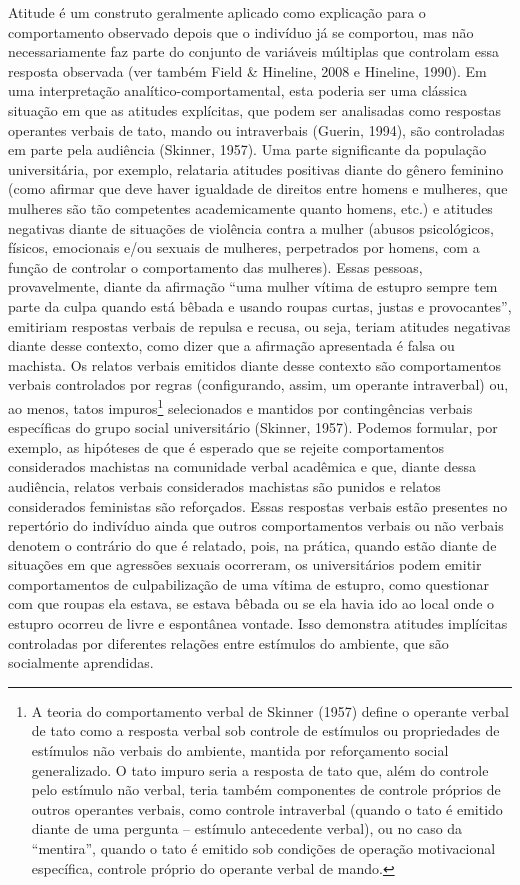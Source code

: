 Atitude é um construto geralmente aplicado como explicação para o comportamento observado depois que o indivíduo já se comportou, mas não necessariamente faz parte do conjunto de variáveis múltiplas que controlam essa resposta observada (ver também Field \& Hineline, 2008 e Hineline, 1990). Em uma interpretação analítico-comportamen\-tal, esta poderia ser uma clássica situação em que as atitudes explícitas, que podem ser analisadas como respostas operantes verbais de tato, mando ou intraverbais (Guerin, 1994), são controladas em parte pela audiência (Skinner, 1957). Uma parte significante da população universitária, por exemplo, relataria atitudes positivas diante do gênero feminino (como afirmar que deve haver igualdade de direitos entre homens e mulheres, que mulheres são tão competentes academicamente quanto homens, etc.) e atitudes negativas diante de situações de violência contra a mulher (abusos psicológicos, físicos, emocionais e/ou sexuais de mulheres, perpetrados por homens, com a função de controlar o comportamento das mulheres). Essas pessoas, provavelmente, diante da afirmação ``uma mulher vítima de estupro sempre tem parte da culpa quando está bêbada e usando roupas curtas, justas e provocantes'', emitiriam respostas verbais de repulsa e recusa, ou seja, teriam atitudes negativas diante desse contexto, como dizer que a afirmação apresentada é falsa ou machista. Os relatos verbais emitidos diante desse contexto são comportamentos verbais controlados por regras (configurando, assim, um operante intraverbal) ou, ao menos, tatos impuros\footnote{A teoria do comportamento verbal de Skinner (1957) define o operante verbal de tato como a resposta verbal sob controle de estímulos ou propriedades de estímulos não verbais do ambiente, mantida por reforçamento social generalizado. O tato impuro seria a resposta de tato que, além do controle pelo estímulo não verbal, teria também componentes de controle próprios de outros operantes verbais, como controle intraverbal (quando o tato é emitido diante de uma pergunta – estímulo antecedente verbal), ou no caso da ``mentira'', quando o tato é emitido sob condições de operação motivacional específica, controle próprio do operante verbal de mando.} selecionados e mantidos por contingências verbais específicas do grupo social universitário (Skinner, 1957). Podemos formular, por exemplo, as hipóteses de que é esperado que se rejeite comportamentos considerados machistas na comunidade verbal acadêmica e que, diante dessa audiência, relatos verbais considerados machistas são punidos e relatos considerados feministas são reforçados. Essas respostas verbais estão presentes no repertório do indivíduo ainda que outros comportamentos verbais ou não verbais denotem o contrário do que é relatado, pois, na prática, quando estão diante de situações em que agressões sexuais ocorreram, os universitários podem emitir comportamentos de culpabilização de uma vítima de estupro, como questionar com que roupas ela estava, se estava bêbada ou se ela havia ido ao local onde o estupro ocorreu de livre e espontânea vontade. Isso demonstra atitudes implícitas controladas por diferentes relações entre estímulos do ambiente, que são socialmente aprendidas.

